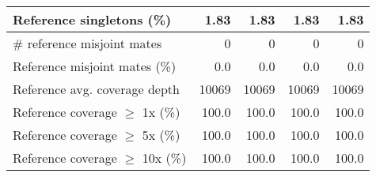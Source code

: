 \documentclass[12pt,a4paper]{article}
\begin{document}
\begin{table}[ht]
\begin{center}
\begin{tabular}{|l*{4}{|r}|}
Reference singletons (\%) & 1.83 & 1.83 & 1.83 & 1.83 \\ \hline
\# reference misjoint mates & 0 & 0 & 0 & 0 \\ \hline
Reference misjoint mates (\%) & 0.0 & 0.0 & 0.0 & 0.0 \\ \hline
Reference avg. coverage depth & 10069 & 10069 & 10069 & 10069 \\ \hline
Reference coverage $\geq$ 1x (\%) & 100.0 & 100.0 & 100.0 & 100.0 \\ \hline
Reference coverage $\geq$ 5x (\%) & 100.0 & 100.0 & 100.0 & 100.0 \\ \hline
Reference coverage $\geq$ 10x (\%) & 100.0 & 100.0 & 100.0 & 100.0 \\ \hline
\end{tabular}
\end{center}
\end{table}
\end{document}
